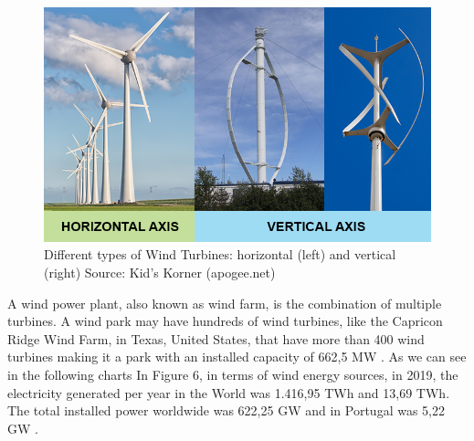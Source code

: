 \begin{figure}[]
	\centering
	\includegraphics[width=\textwidth]{Chapters/Figures/background_fig5.png}
	\caption{Different types of Wind Turbines: horizontal (left) and vertical (right) Source: Kid's Korner (apogee.net) }
	\label{fig:Figuras_Tree_silhouettes-vectorial}
\end{figure}



A wind power plant, also known as wind farm, is the combination of multiple turbines. A wind park may have hundreds of wind turbines, like the Capricon Ridge Wind Farm, in Texas, United States, that have more than 400 wind turbines making it a park with an installed capacity of 662,5 MW \cite{OLD_35_WIND}.
As we can see in the following charts In Figure 6, in terms of wind energy sources, in 2019, the electricity generated per year in the World was 1.416,95 TWh and 13,69 TWh. The total installed power worldwide was 622,25 GW and in Portugal was 5,22 GW \cite{OLD_33_GENERAL}.


